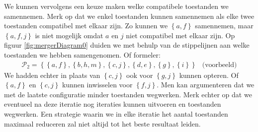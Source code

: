 We kunnen vervolgens een keuze maken welke compatibele toestanden we samennemen. Merk op dat we enkel toestanden kunnen samennemen als elke twee toestanden compatibel met elkaar zijn. Zo kunnen we $\left\{a,f\right\}$ samennemen, maar $\left\{a,f,j\right\}$ is niet mogelijk omdat $a$ en $j$ niet compatibel met elkaar zijn. Op figuur \ref{fig:mergerDiagram0} duiden we met behulp van de stippelijnen aan welke toestanden we hebben samengenomen. Of formeler:\begin{equation}
\begin{array}{lr}
\mathcal{P}_2=\left\{\left\{a,f\right\},\left\{b,h,m\right\},\left\{c,j\right\},\left\{d,e\right\},\left\{g\right\},\left\{i\right\}\right\}&\mbox{(voorbeeld)}
\end{array}
\end{equation}
We hadden echter in plaats van $\left\{c,j\right\}$ ook voor $\left\{g,j\right\}$ kunnen opteren. Of $\left\{a,f\right\}$ en $\left\{c,j\right\}$ kunnen inwisselen voor $\left\{f,j\right\}$. Men kan argumenteren dat we met de laatste configuratie minder toestanden wegwerken. Merk echter op dat we eventueel na deze iteratie nog iteraties kunnen uitvoeren en toestanden wegwerken. Een strategie waarin we in elke iteratie het aantal toestanden maximaal reduceren zal niet altijd tot het beste resultaat leiden.
